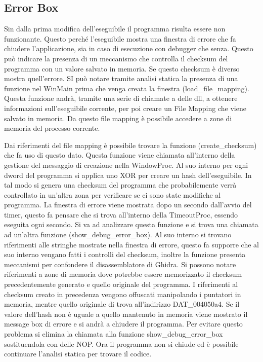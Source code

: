 \documentclass[a4paper,10pt]{article}
\begin{document}
\subsection{Error Box}
Sin dalla prima modifica dell'eseguibile il programma risulta essere non funzionante. Questo perché l'eseguibile mostra una finestra di errore che fa chiudere l'applicazione, sia in caso di esecuzione con debugger che senza.  Questo può indicare la presenza di un meccanismo che controlla il checksum del programma con un valore salvato in memoria. Se questo checksum è diverso mostra quell'errore. SI può notare tramite analisi statica la presenza di una funzione nel WinMain prima che venga creata la finestra (load\_file\_mapping). Questa funzione andrà, tramite una serie di chiamate a delle dll, a ottenere informazioni sull'eseguibile corrente, per poi creare un File Mapping che viene salvato in memoria. Da questo file mapping è possibile accedere a zone di memoria del processo corrente. 

Dai riferimenti del file mapping è possibile trovare la funzione (create\_checksum) che fa uso di questo dato. Questa funzione viene chiamata all'interno della gestione del messaggio di creazione nella WindowProc. Al suo interno per ogni dword del programma si applica uno XOR per creare un hash dell'eseguibile.  In tal modo si genera una checksum del programma che probabilemente verrà controllato in un'altra zona per verificare se ci sono state modifiche al programma.  La finestra di errore viene mostrata dopo un secondo dall'avvio del timer, questo fa pensare che si trova all'interno della TimeoutProc, essendo eseguita ogni secondo. Si va ad analizzare questa funzione e si trova una chiamata ad un'altra funzione (show\_debug\_error\_box). Al suo interno si trovano riferimenti alle stringhe mostrate nella finestra di errore, questo fa supporre che al suo interno vengano fatti i controlli del checksum, inoltre la funzione presenta meccanismi per confondere il disassemblatore di Ghidra. Si possono notare riferimenti a zone di memoria  dove potrebbe essere memorizzato il checksum precedentemente generato e quello originale del programma. I riferimenti al checksum creato in precedenza vengono offuscati  manipolando i puntatori in memoria, mentre quello originale di trova all'indirizzo DAT\_004050a4. Se il valore dell'hash non è uguale a quello mantenuto in memoria viene mostrato il message box di errore e si andrà a chiudere il programma. Per evitare questo problema si elimina la chiamata alla funzione show\_debug\_error\_box sostituendola con delle NOP. Ora il programma non si chiude ed è possibile continuare l'analisi statica per trovare il codice.
\end{document}
